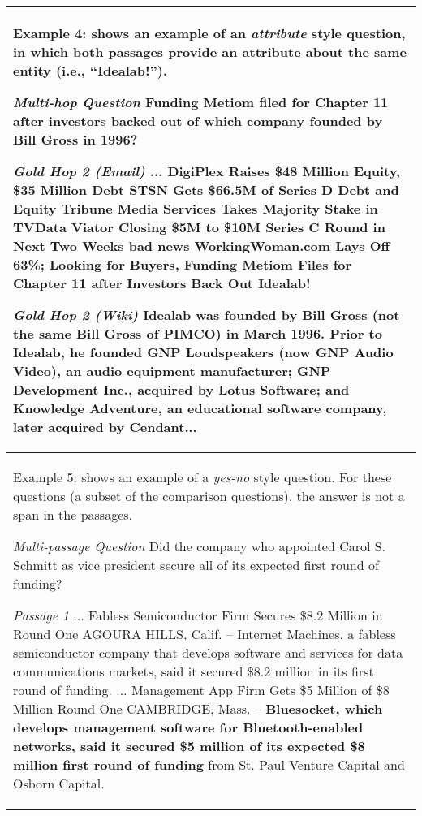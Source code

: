 \documentclass{article}
\newcommand{\blue}[1]{{\color{blue}#1}}
\begin{document}
\begin{table*}[t]
\begin{tabular}{p{15cm}}
\toprule
\blue{Example 4: shows an example of an \textit{attribute} style question, in which both passages provide an attribute about the same entity (i.e., ``Idealab!'').}\newline

\textit{Multi-hop Question} Funding Metiom filed for Chapter 11 after investors backed out of which company founded by Bill Gross in 1996?\newline

\textit{Gold Hop 2 (Email)} ... DigiPlex Raises \$48 Million Equity, \$35 Million Debt STSN Gets \$66.5M of Series D Debt and Equity Tribune Media Services Takes Majority Stake in TVData Viator Closing \$5M to \$10M Series C Round in Next Two Weeks bad news WorkingWoman.com Lays Off 63\%; Looking for Buyers, Funding \textbf{Metiom Files for Chapter 11 after Investors Back Out Idealab!}\newline

\textit{Gold Hop 2 (Wiki)} \textbf{Idealab was founded by Bill Gross (not the same Bill Gross of PIMCO) in March 1996.} Prior to Idealab, he founded GNP Loudspeakers (now GNP Audio Video), an audio equipment manufacturer; GNP Development Inc., acquired by Lotus Software; and Knowledge Adventure, an educational software company, later acquired by Cendant... \\
\midrule
\blue{Example 5: shows an example of a \textit{yes-no} style question. For these questions (a subset of the comparison questions), the answer is not a span in the passages.}\newline

\textit{Multi-passage Question} Did the company who appointed Carol S. Schmitt as vice president secure all of its expected first round of funding?\newline

\textit{Passage 1} ... Fabless Semiconductor Firm Secures \$8.2 Million in Round One AGOURA HILLS, Calif. -- Internet Machines, a fabless semiconductor company that develops software and services for data communications markets, said it secured \$8.2 million in its first round of funding. ...  Management App Firm Gets \$5 Million of \$8 Million Round One CAMBRIDGE, Mass. -- \textbf{Bluesocket, which develops management software for Bluetooth-enabled networks, said it secured \$5 million of its expected \$8 million first round of funding} from St. Paul Venture Capital and Osborn Capital.\newline


\end{tabular}
\end{table*}
\end{document}
